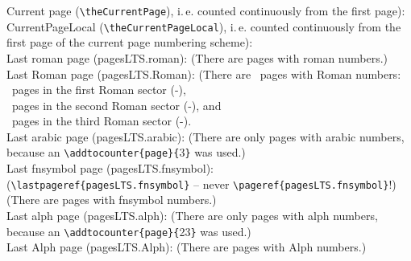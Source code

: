 \documentclass[british]{article}
\def\pagesLTSexampleArabic{3}
\def\pagesLTSexamplealph{23}
\begin{document}
\noindent Current page (\verb|\theCurrentPage|),
i.\,e. counted continuously from the first page): \theCurrentPage \\

\noindent CurrentPageLocal (\verb|\theCurrentPageLocal|),
i.\,e. counted continuously from the first page of the
current page numbering scheme): \theCurrentPageLocal \\

\noindent Last roman page (pagesLTS.roman): 
(There are  pages with roman numbers.)\\

\noindent Last Roman page (pagesLTS.Roman): 
(There are ~pages with Roman numbers:\\
~pages in the first Roman sector
(\pageref{Roman}{\hskip3em }-),\\
~pages in the second Roman sector
(\pageref{Roman2}{\hskip3em }-), and\\
~pages in the third Roman sector
(\pageref{Roman3}{\hskip3em }-).\\

\noindent Last arabic page (pagesLTS.arabic): 
(There are only  pages with arabic numbers,
because an \verb|\addtocounter{page}{|\pagesLTSexampleArabic\verb|}| was used.)\\

\noindent Last fnsymbol page (pagesLTS.fnsymbol):  \\
(\verb|\lastpageref{pagesLTS.fnsymbol}| -- never \verb|\pageref{pagesLTS.fnsymbol}|!)\\
(There are  pages with fnsymbol numbers.)\\

\noindent Last alph page (pagesLTS.alph): 
(There are only  pages with alph numbers,
because an \verb|\addtocounter{page}{|\pagesLTSexamplealph\verb|}| was used.)\\

\noindent Last Alph page (pagesLTS.Alph): 
(There are  pages with Alph numbers.)\\
\end{document}

